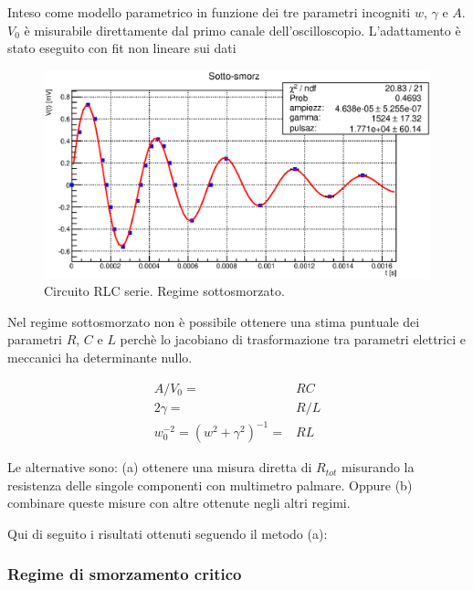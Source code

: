 Inteso come modello parametrico in funzione dei tre parametri incogniti $w$, $\gamma$ e $A$. $V_0$ è misurabile direttamente dal primo canale dell'oscilloscopio. L'adattamento è stato eseguito con fit non lineare sui dati



\begin{figure}[H]
\centering
\includegraphics[scale=0.75]{Grafici/C4_P1_Sotto-smorz.eps}
\caption{
Circuito RLC serie. Regime sottosmorzato.
}
\label{fig:C4_P1_sotto}
\end{figure}

Nel regime sottosmorzato non è possibile ottenere una stima puntuale dei parametri $R$, $C$ e $L$ perchè lo jacobiano di trasformazione tra parametri elettrici e meccanici ha determinante nullo.

\begin{align*}
    A / V_0 = & RC   \\
    2\gamma    = & R/L   \\
    w_0^{-2} = (w^2+\gamma^2)^{-1}    = & RL
\end{align*}

Le alternative sono: (a) ottenere una misura diretta di $R_{tot}$ misurando la resistenza delle singole componenti con multimetro palmare. Oppure (b) combinare queste misure con altre ottenute negli altri regimi.

Qui di seguito i risultati ottenuti seguendo il metodo (a):








\subsubsection{Regime di smorzamento critico}

